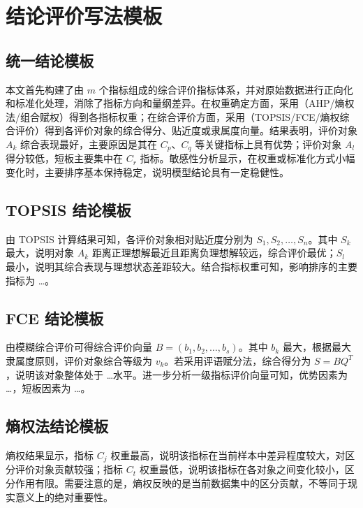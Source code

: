 \documentclass[UTF8,zihao=-4]{ctexart}
\begin{document}
\section{结论评价写法模板}
\subsection{统一结论模板}
\begin{tcolorbox}
本文首先构建了由 $m$ 个指标组成的综合评价指标体系，并对原始数据进行正向化和标准化处理，消除了指标方向和量纲差异。在权重确定方面，采用（AHP/熵权法/组合赋权）得到各指标权重；在综合评价方面，采用（TOPSIS/FCE/熵权综合评价）得到各评价对象的综合得分、贴近度或隶属度向量。结果表明，评价对象 $A_k$ 综合表现最好，主要原因是其在 $C_p$、$C_q$ 等关键指标上具有优势；评价对象 $A_l$ 得分较低，短板主要集中在 $C_r$ 指标。敏感性分析显示，在权重或标准化方式小幅变化时，主要排序基本保持稳定，说明模型结论具有一定稳健性。
\end{tcolorbox}

\subsection{TOPSIS 结论模板}
\begin{tcolorbox}
由 TOPSIS 计算结果可知，各评价对象相对贴近度分别为 $S_1,S_2,\ldots,S_n$。其中 $S_k$ 最大，说明对象 $A_k$ 距离正理想解最近且距离负理想解较远，综合评价最优；$S_l$ 最小，说明其综合表现与理想状态差距较大。结合指标权重可知，影响排序的主要指标为 \ldots。
\end{tcolorbox}

\subsection{FCE 结论模板}
\begin{tcolorbox}
由模糊综合评价可得综合评价向量 $B=(b_1,b_2,\ldots,b_s)$。其中 $b_k$ 最大，根据最大隶属度原则，评价对象综合等级为 $v_k$。若采用评语赋分法，综合得分为 $S=BQ^T$，说明该对象整体处于 \ldots 水平。进一步分析一级指标评价向量可知，优势因素为 \ldots，短板因素为 \ldots。
\end{tcolorbox}

\subsection{熵权法结论模板}
\begin{tcolorbox}
熵权结果显示，指标 $C_j$ 权重最高，说明该指标在当前样本中差异程度较大，对区分评价对象贡献较强；指标 $C_t$ 权重最低，说明该指标在各对象之间变化较小，区分作用有限。需要注意的是，熵权反映的是当前数据集中的区分贡献，不等同于现实意义上的绝对重要性。
\end{tcolorbox}
\end{document}

